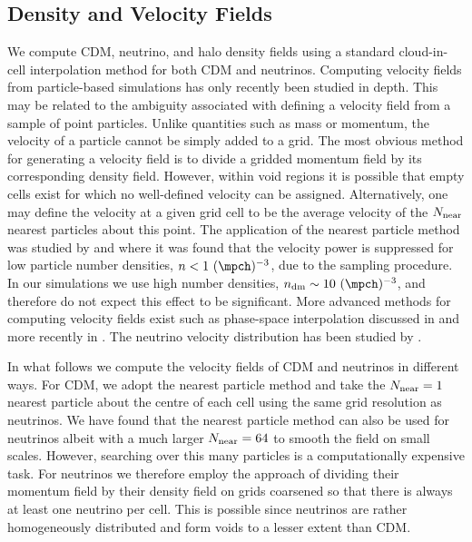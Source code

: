 \subsection{Density and Velocity Fields}
\label{ssec:velocity}

We compute CDM, neutrino, and halo density fields using a standard cloud-in-cell interpolation method for both CDM and neutrinos. Computing velocity fields from particle-based simulations has only recently been studied in depth. This may be related to the ambiguity associated with defining a velocity field from a sample of point particles. Unlike quantities such as mass or momentum, the velocity of a particle cannot be simply added to a grid. The most obvious method for generating a velocity field is to divide a gridded momentum field by its corresponding density field. However, within void regions it is possible that empty cells exist for which no well-defined velocity can be assigned. Alternatively, one may define the velocity at a given grid cell to be the average velocity of the $N_{\rm near}$ nearest particles about this point.  The application of the nearest particle method was studied by \citet{zhang/etal:2015} and \citet{zheng/etal:2015} where it was found that the velocity power is suppressed for low particle number densities, $n<1\ (\mpch)^{-3}$, due to the sampling procedure.  In our simulations we use high number densities, $n_{\rm dm} \sim 10\ (\mpch)^{-3}$, and therefore do not expect this effect to be significant.  More advanced methods for computing velocity fields exist such as phase-space interpolation discussed in \citet{pueblas/scoccimarro:2009} and more recently in \citet{hahn/etal:2014}.  The neutrino velocity distribution has been studied by \citet{villaescusa-navarro/etal:2013}.
  
In what follows we compute the velocity fields of CDM and neutrinos in different ways.  For CDM, we adopt the nearest particle method and take the $N_{\rm near} = 1$ nearest particle about the centre of each cell using the same grid resolution as neutrinos.  We have found that the nearest particle method can also be used for neutrinos albeit with a much larger $N_{\rm near} = 64$ to smooth the field on small scales. However, searching over this many particles is a computationally expensive task.  For neutrinos we therefore employ the approach of dividing their momentum field by their density field on grids coarsened so that there is always at least one neutrino per cell. This is possible since neutrinos are rather homogeneously distributed and form voids to a lesser extent than CDM.

